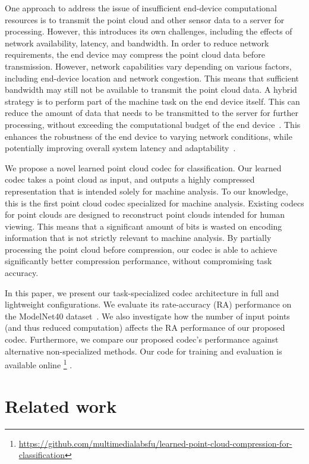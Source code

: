 One approach to address the issue of insufficient end-device computational resources is to transmit the point cloud and other sensor data to a server for processing.
However, this introduces its own challenges, including the effects of network availability, latency, and bandwidth.
In order to reduce network requirements, the end device may compress the point cloud data before transmission.
However, network capabilities vary depending on various factors, including end-device location and network congestion.
This means that sufficient bandwidth may still not be available to transmit the point cloud data.
A hybrid strategy is to perform part of the machine task on the end device itself.
This can reduce the amount of data that needs to be transmitted to the server for further processing, without exceeding the computational budget of the end device~\cite{kang2017neurosurgeon}.
This enhances the robustness of the end device to varying network conditions, while potentially improving overall system latency and adaptability~\cite{shlezinger2022IOTM}.

We propose a novel learned point cloud codec for classification.
Our learned codec takes a point cloud as input, and outputs a highly compressed representation that is intended solely for machine analysis.
To our knowledge, this is the first point cloud codec specialized for machine analysis.
Existing codecs for point clouds are designed to reconstruct point clouds intended for human viewing.
This means that a significant amount of bits is wasted on encoding information that is not strictly relevant to machine analysis.
By partially processing the point cloud before compression, our codec is able to achieve significantly better compression performance, without compromising task accuracy.

In this paper, we present our task-specialized codec architecture in full and lightweight configurations.
We evaluate its rate-accuracy (RA) performance on the ModelNet40 dataset~\cite{wu20143d}.
We also investigate how the number of input points (and thus reduced computation) affects the RA performance of our proposed codec.
Furthermore, we compare our proposed codec's performance against alternative non-specialized methods.
Our code for training and evaluation is available online%
\footnote{%
  \hfill%
  \url{https://github.com/multimedialabsfu/learned-point-cloud-compression-for-classification}%
}%
.




\section{Related work}
\label{sec:related-work}

